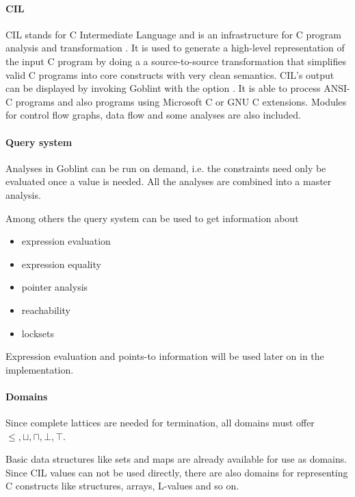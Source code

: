 \paragraph*{CIL}
CIL stands for C Intermediate Language and is an infrastructure for C program analysis and transformation \cite{Necula:2002:CIL:647478.727796}. It is used to generate a high-level representation of the input C program by doing a a source-to-source transformation that simplifies valid C programs into core constructs with very clean semantics. CIL's output can be displayed by invoking Goblint with the option . It is able to process ANSI-C programs and also programs using Microsoft C or GNU C extensions. Modules for control flow graphs, data flow and some analyses are also included.

\paragraph*{Query system}
Analyses in Goblint can be run on demand, i.e. the constraints need only be evaluated once a value is needed. All the analyses are combined into a master analysis.

Among others the query system can be used to get information about
\begin{itemize}
\item expression evaluation
\item expression equality
\item pointer analysis
\item reachability
\item locksets
\end{itemize}
Expression evaluation and points-to information will be used later on in the implementation.

\paragraph*{Domains}
Since complete lattices are needed for termination, all domains must offer $\leq, \sqcup, \sqcap, \bot, \top$.

Basic data structures like sets and maps are already available for use as domains. Since CIL values can not be used directly, there are also domains for representing C constructs like structures, arrays, L-values and so on.


